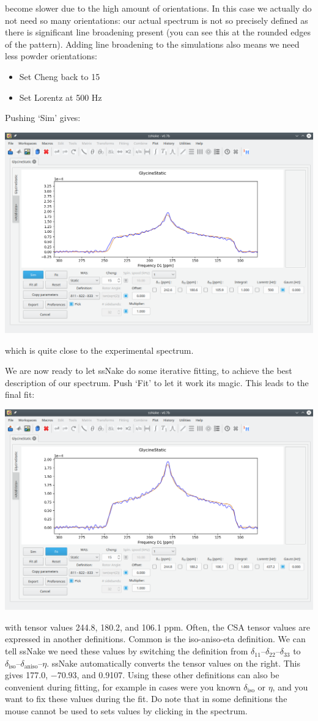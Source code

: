 \documentclass[11pt,a4paper]{article}
\begin{document}
become slower due to the high amount of orientations. In this case we actually do not need so many
orientations: our actual spectrum is not so precisely defined as there is significant
line broadening present (you can see this at the rounded edges of the pattern). Adding line
broadening to the simulations also means we need less powder orientations:
\begin{itemize}
  \item Set Cheng back to 15
  \item Set Lorentz at 500 Hz
\end{itemize}
Pushing `Sim' gives:
\begin{center}
\includegraphics[width=0.8\linewidth]{Figs/Fig5.png}
\end{center}
which is quite close to the experimental spectrum.

We are now ready to let ssNake do some iterative fitting, to achieve the best description of our
spectrum. Push `Fit' to let it work its magic. This leads to the final fit:
\begin{center}
\includegraphics[width=0.8\linewidth]{Figs/Fig6.png}
\end{center}
with tensor values 244.8, 180.2, and 106.1 ppm. Often, the CSA tensor values are expressed in
another definitions. Common is the iso-aniso-eta definition. We can tell ssNake we need these values
by switching the definition from $\delta_{11}$--$\delta_{22}$--$\delta_{33}$ to
$\delta_\text{iso}$--$\delta_\text{aniso}$--$\eta$. ssNake automatically converts the tensor values on
the right. This gives 177.0, $-70.93$, and 0.9107. Using these other definitions can also be
convenient during fitting, for example in cases were you known $\delta_\text{iso}$ or $\eta$, and you
want to fix these values during the fit. Do note that in some definitions the mouse cannot be used
to sets values by clicking in the spectrum.
\end{document}
